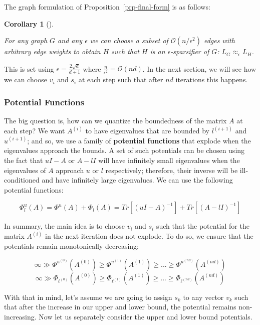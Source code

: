 \documentclass[
  letterpaper,
  DIV=11,
  numbers=noendperiod]{scrartcl}
\theoremstyle{plain}
\theoremstyle{plain}
\newtheorem{corollary}{Corollary}[section]
\theoremstyle{plain}
\theoremstyle{definition}
\theoremstyle{remark}
\begin{document}
The graph formulation of Proposition~\ref{prp-final-form} is as follows:

\leavevmode{}%
\begin{corollary}[]\label{cor-final-form}

For any graph \(G\) and any \(\epsilon\) we can choose a subset of
\(\mathcal{O}(n/\epsilon^2)\) edges with arbitrary edge weights to
obtain \(H\) such that \(H\) is an \(\epsilon\)-sparsifier of \(G\):
\(L_G \approx_\epsilon L_H\).

\end{corollary}

This is set using \(\epsilon = \frac{2\sqrt{d}}{d + 1}\) where
\(\frac{n}{\epsilon^2} = \mathcal{O}(nd)\). In the next section, we will
see how we can choose \(v_i\) and \(s_i\) at each step such that after
\(nd\) iterations this happens.

\hypertarget{potential-functions}{%
\subsubsection{Potential Functions}\label{potential-functions}}

The big question is, how can we quantize the boundedness of the matrix
\(A\) at each step? We want \(A^{(i)}\) to have eigenvalues that are
bounded by \(l^{(i+1)}\) and \(u^{(i+1)}\); and so, we use a family of
\textbf{potential functions} that explode when the eigenvalues approach
the bounds. A set of such potentials can be chosen using the fact that
\(uI - A\) or \(A - lI\) will have infinitely small eigenvalues when the
eigenvalues of \(A\) approach \(u\) or \(l\) respectively; therefore,
their inverse will be ill-conditioned and have infinitely large
eigenvalues. We can use the following potential functions:

\[\Phi^u_l(A) = \Phi^u(A) + \Phi_l(A) = Tr[(uI - A)^{-1}] + Tr[(A - l I)^{-1}]\]

In summary, the main idea is to choose \(v_i\) and \(s_i\) such that the
potential for the matrix \(A^{(i)}\) in the next iteration does not
explode. To do so, we ensure that the potentials remain monotonically
decreasing:

\[\infty \gg \Phi^{u^{(0)}}(A^{(0)}) \ge \Phi^{u^{(1)}}(A^{(1)}) \ge ... \ge \Phi^{u^{(nd)}}(A^{(nd)})\]
\[\infty \gg \Phi_{\ell^{(0)}}(A^{(0)}) \ge \Phi_{\ell^{(1)}}(A^{(1)}) \ge ... \ge \Phi_{\ell^{(nd)}}(A^{(nd)})\]

With that in mind, let's assume we are going to assign \(s_k\) to any
vector \(v_k\) such that after the increase in our upper and lower
bound, the potential remains non-increasing. Now let us separately
consider the upper and lower bound potentials.
\end{document}
